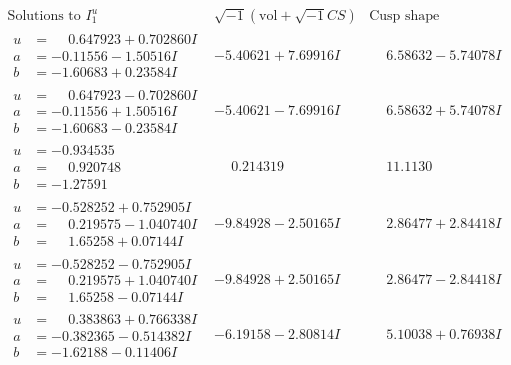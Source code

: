 \documentclass[1p]{elsarticle_modified}
\theoremstyle{definition}
\newcommand{\I}{\sqrt{-1}}
\begin{document}
$$\begin{array}{c|c|c}  
\text{Solutions to }I^u_{1}& \I (\text{vol} + \sqrt{-1}CS) & \text{Cusp shape}\\
 \hline 
\begin{aligned}
u &= \phantom{-}0.647923 + 0.702860 I \\
a &= -0.11556 - 1.50516 I \\
b &= -1.60683 + 0.23584 I\end{aligned}
 & -5.40621 + 7.69916 I & \phantom{-}6.58632 - 5.74078 I \\ \hline\begin{aligned}
u &= \phantom{-}0.647923 - 0.702860 I \\
a &= -0.11556 + 1.50516 I \\
b &= -1.60683 - 0.23584 I\end{aligned}
 & -5.40621 - 7.69916 I & \phantom{-}6.58632 + 5.74078 I \\ \hline\begin{aligned}
u &= -0.934535\phantom{ +0.000000I} \\
a &= \phantom{-}0.920748\phantom{ +0.000000I} \\
b &= -1.27591\phantom{ +0.000000I}\end{aligned}
 & \phantom{-}0.214319\phantom{ +0.000000I} & \phantom{-}11.1130\phantom{ +0.000000I} \\ \hline\begin{aligned}
u &= -0.528252 + 0.752905 I \\
a &= \phantom{-}0.219575 - 1.040740 I \\
b &= \phantom{-}1.65258 + 0.07144 I\end{aligned}
 & -9.84928 - 2.50165 I & \phantom{-}2.86477 + 2.84418 I \\ \hline\begin{aligned}
u &= -0.528252 - 0.752905 I \\
a &= \phantom{-}0.219575 + 1.040740 I \\
b &= \phantom{-}1.65258 - 0.07144 I\end{aligned}
 & -9.84928 + 2.50165 I & \phantom{-}2.86477 - 2.84418 I \\ \hline\begin{aligned}
u &= \phantom{-}0.383863 + 0.766338 I \\
a &= -0.382365 - 0.514382 I \\
b &= -1.62188 - 0.11406 I\end{aligned}
 & -6.19158 - 2.80814 I & \phantom{-}5.10038 + 0.76938 I \\ \hline\begin{aligned}

\end{aligned}
\end{array}$$
\end{document}

